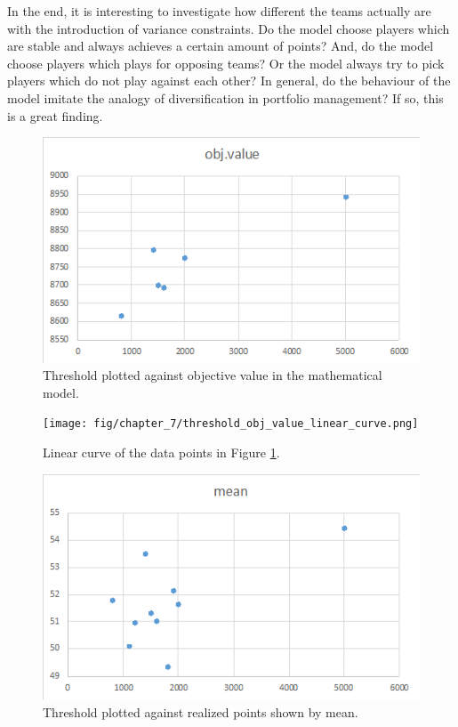 \newpar

In the end, it is interesting to investigate how different the teams actually are with the introduction of variance constraints. Do the model choose players which are stable and always achieves a certain amount of points? And, do the model choose players which plays for opposing teams? Or the model always try to pick players which do not play against each other? In general, do the behaviour of the model imitate the analogy of diversification in portfolio management? If so, this is a great finding. 


\begin{figure}[H]
    \centering
    \includegraphics[scale=0.75]{fig/chapter_7/threshold_obj_value.png}
    \caption{Threshold plotted against objective value in the mathematical model.}
\label{fig:threshold_obj_value}    
\end{figure}

\begin{figure}[H]
    \centering
    \texttt{[image: fig/chapter\_7/threshold\_obj\_value\_linear\_curve.png]}
    \caption{Linear curve of the data points in Figure \ref{fig:threshold_obj_value}.}
\label{fig:threshold_obj_value_linear_curve}    
\end{figure}


\begin{figure}[H]
    \centering
    \includegraphics[scale=0.75]{fig/chapter_7/threshold_mean.png}
    \caption{Threshold plotted against realized points shown by mean.}
\label{fig:threshold_mean}    
\end{figure}

